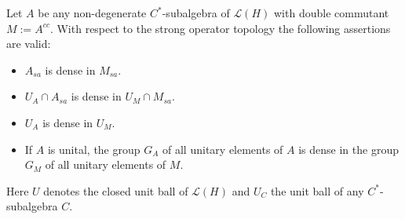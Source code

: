 Let $A$ be any non-degenerate $C^*$-subalgebra of $\mathcal{L}(H)$ with double commutant $M := A^{cc}$. With respect to the strong operator topology the following assertions are valid:
\begin{itemize}
\item[(a)] $A_{sa}$ is dense in $M_{sa}$.
\item[(b)] $U_A \cap A_{sa}$ is dense in $U_M \cap M_{sa}$.
\item[(c)] $U_A$ is dense in $U_M$.
\item[(d)] If $A$ is unital, the group $G_A$ of all unitary elements of $A$ is dense in the group $G_M$ of all unitary elements of $M$.
\end{itemize}
Here $U$ denotes the closed unit ball of $\mathcal{L}(H)$ and $U_C$ the unit ball of any $C^*$-subalgebra $C$.
